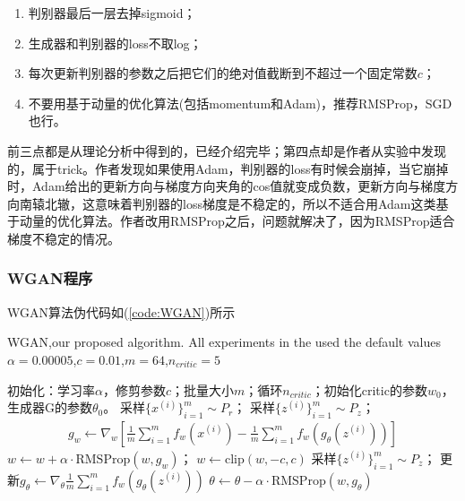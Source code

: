             \begin{enumerate}
            \item 判别器最后一层去掉sigmoid；
            \item 生成器和判别器的loss不取log；
            \item 每次更新判别器的参数之后把它们的绝对值截断到不超过一个固定常数$c$；
            \item 不要用基于动量的优化算法(包括momentum和Adam)，推荐RMSProp，SGD也行。
            \end{enumerate}
            \par
            前三点都是从理论分析中得到的，已经介绍完毕；第四点却是作者从实验中发现的，属于trick。作者发现如果使用Adam，判别器的loss有时候会崩掉，当它崩掉时，Adam给出的更新方向与梯度方向夹角的cos值就变成负数，更新方向与梯度方向南辕北辙，这意味着判别器的loss梯度是不稳定的，所以不适合用Adam这类基于动量的优化算法。作者改用RMSProp之后，问题就解决了，因为RMSProp适合梯度不稳定的情况。
        \subsubsection{WGAN程序}
            \par
            WGAN算法伪代码如(\ref{code:WGAN})所示
            \begin{algorithm}[htbp]
                \caption{WGAN,our proposed algorithm. All experiments in the used the default values $\alpha = 0.00005$,$c=0.01$,$m=64$,$n_{critic}=5$}\label{code:WGAN}
                \begin{algorithmic}[1]
                    \State 初始化：学习率$\alpha$，修剪参数$c$；批量大小$m$；循环$n_{critic}$；初始化critic的参数$w_0$，生成器G的参数$\theta_0$。
                            \State 采样$\{x^{(i)}\}_{i=1}^m\sim P_r$；
                            \State 采样$\{z^{(i)}\}_{i=1}^m\sim P_z$；
                            \State
                            \begin{align*}
                            g_w \leftarrow \nabla_w \left[\frac{1}{m}\sum_{i=1}^m f_w(x^{(i)}) - \frac{1}{m}\sum_{i=1}^mf_w(g_\theta(z^{(i)}))\right]
                            \end{align*}
                            \State $w\leftarrow w+\alpha \cdot \mathrm{RMSProp}(w,g_w)$；
                            \State $w\leftarrow \mathrm{clip}(w,-c,c)$
                        \EndFor
                        \State 采样$\{z^{(i)}\}_{i=1}^m\sim P_z$；
                        \State 更新$g_\theta \leftarrow \nabla_\theta\frac{1}{m}\sum_{i=1}^mf_w(g_\theta(z^{(i)}))$
                        \State $\theta \leftarrow \theta - \alpha \cdot \mathrm{RMSProp}(w,g_\theta)$
                    \EndWhile
                \end{algorithmic}
            \end{algorithm}

